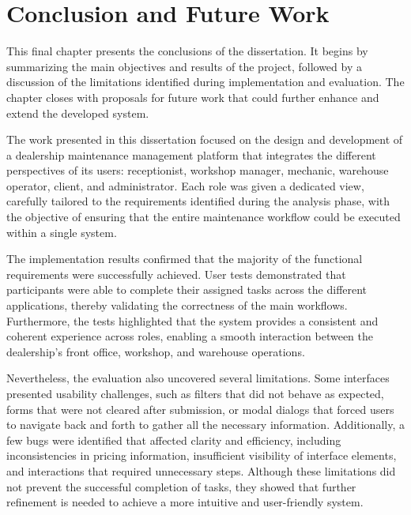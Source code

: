 \chapter{Conclusion and Future Work}%
\label{chapter:Conclusion and Future Work}

\begin{introduction}
This final chapter presents the conclusions of the dissertation. It begins by summarizing the main objectives and results of the project, followed by a discussion of the limitations identified during implementation and evaluation. The chapter closes with proposals for future work that could further enhance and extend the developed system.
\end{introduction} 

The work presented in this dissertation focused on the design and development of a dealership maintenance management platform that integrates the different perspectives of its users: receptionist, workshop manager, mechanic, warehouse operator, client, and administrator. Each role was given a dedicated view, carefully tailored to the requirements identified during the analysis phase, with the objective of ensuring that the entire maintenance workflow could be executed within a single system.

The implementation results confirmed that the majority of the functional requirements were successfully achieved. User tests demonstrated that participants were able to complete their assigned tasks across the different applications, thereby validating the correctness of the main workflows. Furthermore, the tests highlighted that the system provides a consistent and coherent experience across roles, enabling a smooth interaction between the dealership's front office, workshop, and warehouse operations.

Nevertheless, the evaluation also uncovered several limitations. Some interfaces presented usability challenges, such as filters that did not behave as expected, forms that were not cleared after submission, or modal dialogs that forced users to navigate back and forth to gather all the necessary information. Additionally, a few bugs were identified that affected clarity and efficiency, including inconsistencies in pricing information, insufficient visibility of interface elements, and interactions that required unnecessary steps. Although these limitations did not prevent the successful completion of tasks, they showed that further refinement is needed to achieve a more intuitive and user-friendly system.


